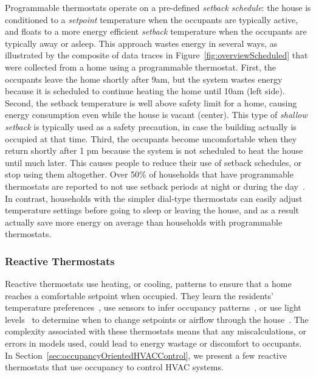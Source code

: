 Programmable thermostats operate on a pre-defined {\em setback schedule}: the
house is conditioned to a {\em setpoint} temperature when the occupants are
typically active, and floats to a more energy efficient {\em setback}
temperature when the occupants are typically away or asleep. This approach
wastes energy in several ways, as illustrated by the composite of data traces in
Figure~\ref{fig:overviewScheduled} that were collected from a home using a
programmable thermostat. First, the occupants leave the home shortly after 9am,
but the system wastes energy because it is scheduled to continue heating the
home until 10am (left side). Second, the setback temperature is well above
safety limit for a home, causing energy consumption even while the house is
vacant (center). This type of {\em shallow setback} is typically used as a
safety precaution, in case the building actually is occupied at that
time. Third, the occupants become uncomfortable when they return shortly after 1
pm because the system is not scheduled to heat the house until much later. This
causes people to reduce their use of setback schedules, or stop using them
altogether. Over 50\% of households that have programmable thermostats are
reported to not use setback periods at night or during the
day~\cite{sumfindings}. In contrast, households with the simpler dial-type
thermostats can easily adjust temperature settings before going to sleep or
leaving the house, and as a result actually save more energy on average than
households with programmable thermostats\cite{sumfindings, sachs04}.

\subsubsection{Reactive Thermostats}

Reactive thermostats use heating, or cooling, patterns to ensure that a home
reaches a comfortable setpoint when occupied. They learn the residents'
temperature preferences~\cite{keyson2000intelligent}, use sensors to infer
occupancy patterns~\cite{fountain1994comport}, or use light
levels~\cite{titus1996advanced} to determine when to change setpoints or airflow
through the house~\cite{fujii1992japanese}. The complexity associated with these
thermostats means that any miscalculations, or errors in models used, could lead
to energy wastage or discomfort to occupants. In
Section~\ref{sec:occupancyOrientedHVACControl}, we present a few reactive
thermostats that use occupancy to control HVAC systems.

